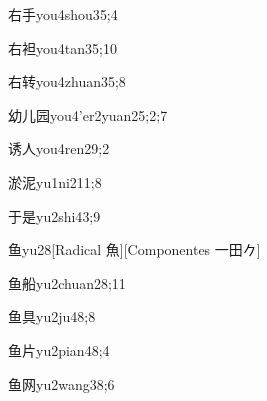 \begin{verbete}{右手}{you4shou3}{5;4}
\end{verbete}

\begin{verbete}{右袒}{you4tan3}{5;10}
\end{verbete}

\begin{verbete}{右转}{you4zhuan3}{5;8}
\end{verbete}

\begin{verbete}{幼儿园}{you4'er2yuan2}{5;2;7}
\end{verbete}

\begin{verbete}{诱人}{you4ren2}{9;2}
\end{verbete}

\begin{verbete}{淤泥}{yu1ni2}{11;8}
\end{verbete}

\begin{verbete}{于是}{yu2shi4}{3;9}
\end{verbete}

\begin{verbete}{鱼}{yu2}{8}[Radical 魚][Componentes 一田𠂊]
\end{verbete}

\begin{verbete}{鱼船}{yu2chuan2}{8;11}
\end{verbete}

\begin{verbete}{鱼具}{yu2ju4}{8;8}
\end{verbete}

\begin{verbete}{鱼片}{yu2pian4}{8;4}
\end{verbete}

\begin{verbete}{鱼网}{yu2wang3}{8;6}
\end{verbete}

